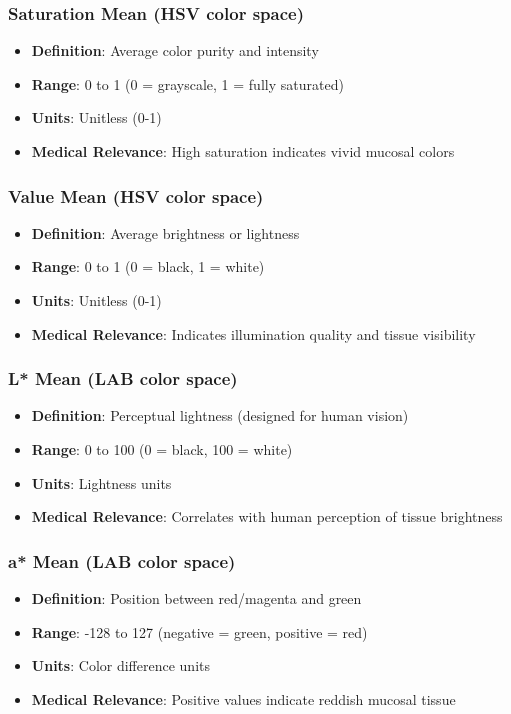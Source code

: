 \documentclass[11pt]{article}
\begin{document}
\subsubsection{Saturation Mean (HSV color space)}
\begin{itemize}
    \item \textbf{Definition}: Average color purity and intensity
    \item \textbf{Range}: 0 to 1 (0 = grayscale, 1 = fully saturated)
    \item \textbf{Units}: Unitless (0-1)
    \item \textbf{Medical Relevance}: High saturation indicates vivid mucosal colors
\end{itemize}

\subsubsection{Value Mean (HSV color space)}
\begin{itemize}
    \item \textbf{Definition}: Average brightness or lightness
    \item \textbf{Range}: 0 to 1 (0 = black, 1 = white)
    \item \textbf{Units}: Unitless (0-1)
    \item \textbf{Medical Relevance}: Indicates illumination quality and tissue visibility
\end{itemize}

\subsubsection{L* Mean (LAB color space)}
\begin{itemize}
    \item \textbf{Definition}: Perceptual lightness (designed for human vision)
    \item \textbf{Range}: 0 to 100 (0 = black, 100 = white)
    \item \textbf{Units}: Lightness units
    \item \textbf{Medical Relevance}: Correlates with human perception of tissue brightness
\end{itemize}

\subsubsection{a* Mean (LAB color space)}
\begin{itemize}
    \item \textbf{Definition}: Position between red/magenta and green
    \item \textbf{Range}: -128 to 127 (negative = green, positive = red)
    \item \textbf{Units}: Color difference units
    \item \textbf{Medical Relevance}: Positive values indicate reddish mucosal tissue
\end{itemize}
\end{document}
